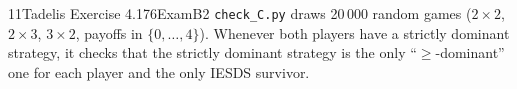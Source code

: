 \begin{exsol}{11}{Tadelis Exercise 4.1}{76}{Exam}{B2}
\verify \texttt{check\_C.py} draws 20\,000 random games ($2\times2$, $2\times3$, $3\times2$,
payoffs in $\{0,\dots,4\}$). Whenever both players have a strictly dominant strategy, it checks
that the strictly dominant strategy is the only ``$\ge$-dominant'' one for each player and the
only IESDS survivor.

\end{exsol}
